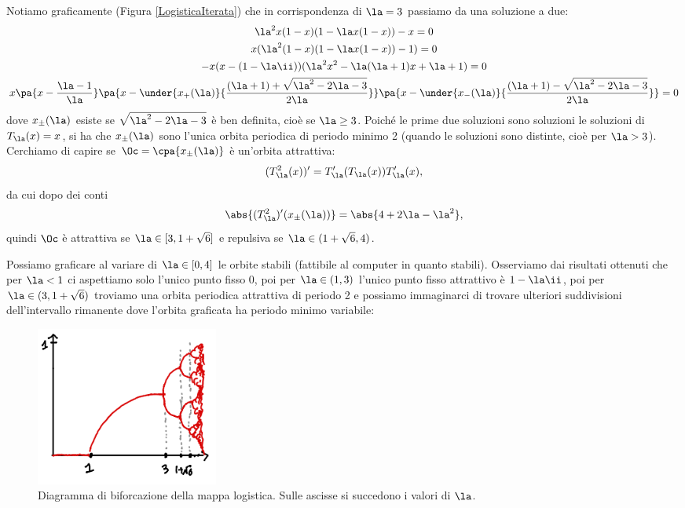 \noindent
Notiamo graficamente (Figura \ref{LogisticaIterata}) che in corrispondenza di $\la=3$ passiamo da una soluzione a due:
\begin{gather*}
\la^2 x(1-x)(1-\la x(1-x))-x=0\\
x(\la^2(1-x)(1-\la x(1-x))-1)=0\\
-x(x-(1-\la\ii))(\la^2x^2-\la(\la+1)x+\la+1)=0\\
x\pa{x-\frac{\la-1}\la}\pa{x-\under{x_+(\la)}{\frac{(\la+1)+\sqrt{\la^2-2\la-3}}{2\la}}}\pa{x-\under{x_-(\la)}{\frac{(\la+1)-\sqrt{\la^2-2\la-3}}{2\la}}}=0
\end{gather*}
dove $x_{\pm}(\la)$ esiste se $\sqrt{\la^2-2\la-3}$ \`e ben definita, cio\`e se $\la\geq 3$. Poich\'e le prime due soluzioni sono soluzioni le soluzioni di $T_\la(x)=x$, si ha che $x_{\pm}(\la)$ sono l'unica orbita periodica di periodo minimo 2 (quando le soluzioni sono distinte, cio\`e per $\la>3$).\\
Cerchiamo di capire se $\Oc=\cpa{x_{\pm}(\la)}$ \`e un'orbita attrattiva:
\[(T_\la^2(x))'=T_\la'(T_\la(x))T'_\la(x),\]
da cui dopo dei conti
\[\abs{(T^2_\la)'(x_{\pm}(\la))}=\abs{4+2\la-\la^2},\]
quindi $\Oc$ \`e attrattiva se $\la\in [3,1+\sqrt 6]$ e repulsiva se $\la\in (1+\sqrt 6,4)$.
\vspace{0.25cm}

\noindent Possiamo graficare al variare di $\la\in [0,4]$ le orbite stabili (fattibile al computer in quanto stabili). Osserviamo dai risultati ottenuti che per $\la<1$ ci aspettiamo solo l'unico punto fisso $0$, poi per $\la\in(1,3)$ l'unico punto fisso attrattivo \`e $1-\la\ii$, poi per $\la\in (3,1+\sqrt 6)$ troviamo una orbita periodica attrattiva di periodo 2 e possiamo immaginarci di trovare ulteriori suddivisioni dell'intervallo rimanente dove l'orbita graficata ha periodo minimo variabile:

\begin{figure}[!htb]
    \centering
    \includegraphics[width=6cm]{Immagini/Diagramma_biforcazione_logistica.png}
    \caption{Diagramma di biforcazione della mappa logistica. Sulle ascisse si succedono i valori di $\la$.}
\end{figure}

